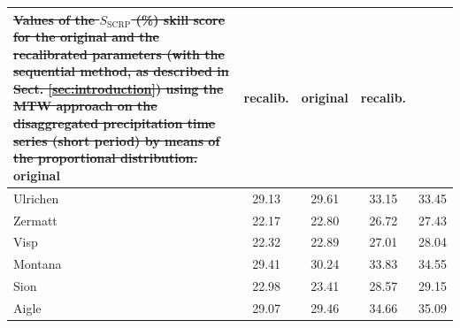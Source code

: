 \documentclass[hess, manuscript]{copernicus}
\providecommand{\DIFdel}[1]{{\protect\color{red}\sout{#1}}}                      %
\providecommand{\DIFdelFL}[1]{\DIFdel{#1}} %
\providecommand{\DIFdelendFL}{} %
\begin{document}
\begin{table}[htb]
\begin{center}
\begin{tabular}{l c c c c}
{%
\DIFdelFL{Values of the $S_{\text{SCRP}}$ (\%) skill score for the original and the recalibrated parameters (with the sequential method, as described in Sect. \ref{sec:introduction}) using the MTW approach on the disaggregated precipitation time series (short period) by means of the proportional distribution.}}
\DIFdelendFL original & recalib. & original & recalib. \\
				\hline
				Ulrichen & 29.13 & 29.61 & 33.15 & 33.45 \\
				Zermatt & 22.17 & 22.80 & 26.72 & 27.43 \\
				Visp & 22.32 & 22.89 & 27.01 & 28.04 \\
				Montana & 29.41 & 30.24 & 33.83 & 34.55 \\
				Sion & 22.98 & 23.41 & 28.57 & 29.15 \\
				Aigle & 29.07 & 29.46 & 34.66 & 35.09 \\
				\hline
			\end{tabular}
		\end{center}
		\label{table:disaggregation_proportional}
	\end{table}
\end{document}
